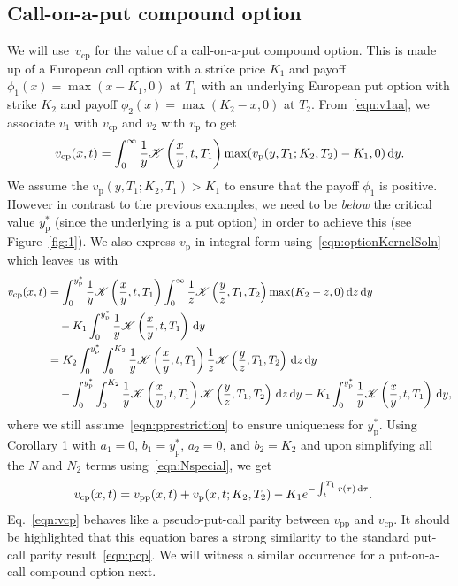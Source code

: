 \subsection{Call-on-a-put compound option}
We will use~$v_\mathrm{cp}$ for the value of a call-on-a-put compound option. This is made up of a European call option with a strike price $K_1$ and payoff $\phi_1(x) = \max(x-K_1,0)$ at $T_1$ with an underlying European put option with strike $K_2$ and payoff $\phi_2(x) = \max(K_2-x,0)$ at $T_2$.  From~\eqref{eqn:v1aa}, we associate $v_1$ with $v_\mathrm{cp}$ and $v_2$ with $v_\mathrm{p}$ to get
	$$
		v_\mathrm{cp}(x,t) = \int_0^\infty \frac{1}{y}\mathscr K\left( \frac{x}{y}, t, T_1 \right)\max(v_\mathrm{p}(y,T_1;K_2,T_2) - K_1, 0) \, \mathrm d y.
	$$
We assume the $v_\mathrm{p}(y,T_1;K_2,T_1) > K_1$ to ensure that the payoff $\phi_1$ is positive. However in contrast to the previous examples, we need to be \emph{below} the critical value $y_\text{p}^*$ (since the underlying is a put option) in order to achieve this (see Figure~\ref{fig:1}). We also express $v_\text{p}$ in integral form using~\eqref{eqn:optionKernelSoln} which leaves us with
		\begin{align*}
		v_\text{cp}(x,t) &= \int_{0}^{y_\mathrm{p}^*} \frac{1}{y}\mathscr K\left( \frac{x}{y}, t, T_1 \right)\int_0^\infty \frac{1}{z} \mathscr K\left( \frac{y}{z}, T_1, T_2 \right)\max(K_2-z, 0) \, \mathrm d z \, \mathrm d y \\
		& \quad - K_1\int_{0}^{y_\mathrm{p}^*} \frac{1}{y}\mathscr K\left( \frac{x}{y}, t, T_1 \right) \, \mathrm d y \\
		&=  K_2\int_{0}^{y_\mathrm{p}^*} \int_{0}^{K_2} \frac{1}{y}\mathscr K\left( \frac{x}{y}, t, T_1 \right)\frac{1}{z}\mathscr K\left( \frac{y}{z}, T_1, T_2 \right) \, \mathrm d z \, \mathrm d y \\
		& \quad - \int_{0}^{y_\mathrm{p}^*} \int_0^{K_2} \frac{1}{y}\mathscr K\left( \frac{x}{y}, t, T_1 \right)\mathscr K\left( \frac{y}{z}, T_1, T_2 \right) \, \mathrm d z \, \mathrm d y - K_1\int_{0}^{y_\mathrm{p}^*} \frac{1}{y}\mathscr K\left( \frac{x}{y}, t, T_1 \right) \, \mathrm d y,
	\end{align*}
where we still assume~\eqref{eqn:pprestriction} to ensure uniqueness for $y_\text{p}^*$. Using Corollary 1 with $a_1 = 0$, $b_1 = y_\mathrm{p}^*$, $a_2 = 0$, and $b_2 = K_2$ and upon simplifying all the $N$ and $N_2$ terms using~\eqref{eqn:Nspecial}, we get	\begin{equation}
		\label{eqn:vcp}
		\begin{split}
		v_\text{cp}(x,t) &= v_\text{pp}(x,t) + v_\text{p}(x,t;K_2,T_2) - K_1e^{-\int_t^{T_1} r(\tau) \, \mathrm d\tau}.
		\end{split}
	\end{equation}
Eq.~\eqref{eqn:vcp} behaves like a pseudo-put-call parity between $v_\text{pp}$ and $v_\text{cp}$. It should be highlighted that this equation bares a strong similarity to the standard put-call parity result~\eqref{eqn:pcp}. We will witness a similar occurrence for a put-on-a-call compound option next.
	
